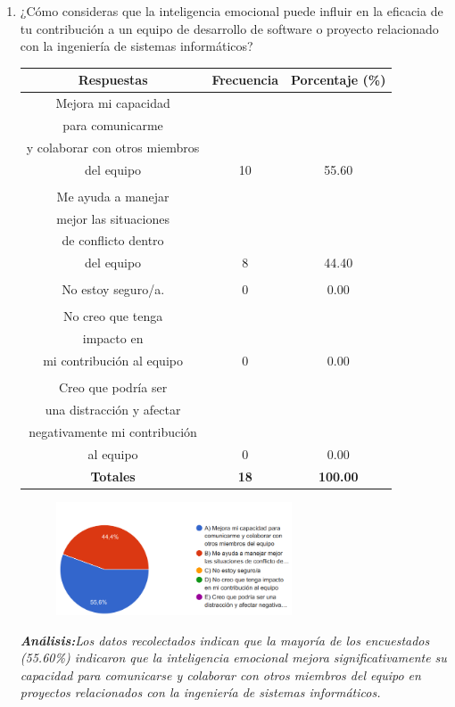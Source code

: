 \documentclass[journal]{IEEEtran}
\begin{document}
\begin{enumerate}
\item¿Cómo consideras que la inteligencia emocional puede influir en la eficacia de tu contribución a un equipo de desarrollo de software o proyecto relacionado con la ingeniería de sistemas informáticos?
	\begin{table}[H]
		\renewcommand{\arraystretch}{1.3}
		\centering
		\begin{tabular}{c c c}
			\hline
			\textbf{Respuestas} & \textbf{Frecuencia} & \textbf{Porcentaje (\%)}\\
			\hline
			Mejora mi capacidad \\para comunicarme\\ y colaborar con otros miembros\\ del equipo & 10 & 55.60 \\
			\\Me ayuda a manejar \\mejor las situaciones\\ de conflicto dentro \\del equipo & 8 & 44.40 \\
			\\No estoy seguro/a. & 0 & 0.00\\
			\\No creo que tenga \\impacto en \\mi contribución al equipo & 0 & 0.00\\
			\\Creo que podría ser\\ una distracción y afectar\\ negativamente mi contribución \\al equipo & 0 & 0.00\\
			\hline
			\textbf{Totales} &\textbf{18}& \textbf{100.00}\\
			\hline
		\end{tabular}
	\end{table}
	\begin{figure}[h]
		\centering
		\includegraphics[width=07cm]{Pregunta 9}
	\end{figure}
	\textit{\textbf{Análisis:}Los datos recolectados indican que la mayoría de los encuestados (55.60\%) indicaron que la inteligencia emocional mejora significativamente su capacidad para comunicarse y colaborar con otros miembros del equipo en proyectos relacionados con la ingeniería de sistemas informáticos.
}
\end{enumerate}
\end{document}
